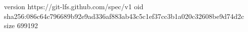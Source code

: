 version https://git-lfs.github.com/spec/v1
oid sha256:086c64c796689b92e9ad336af883ab43c5c1ef37cc3b1a020c32608be9d74d2c
size 699192
